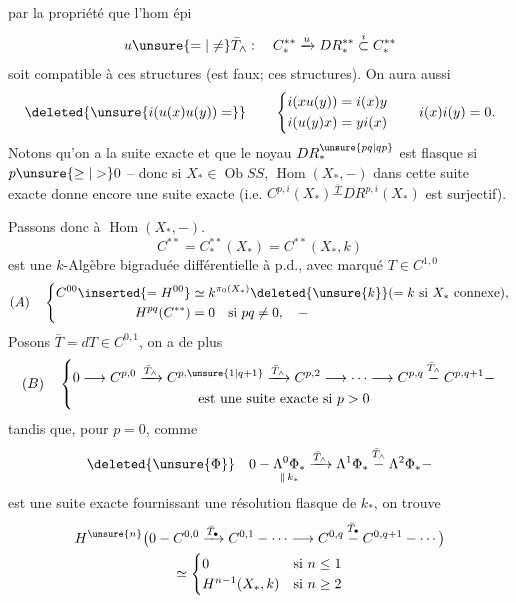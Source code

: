 par la propriété que l'hom épi
\[
u\unsure{=|\ne}\bar T_\wedge:\quad C_*^{**}\xrightarrow{u}DR_*^{**}\overset{i}{\subset}C_*^{**}
\]
soit compatible à ces structures (est faux;  \uline{} ces structures).
On aura aussi
\[
\deleted{\unsure{i(u(x)u(y))=}}\qquad
\left\{\begin{aligned}
i(xu(y))&=i(x)y\\
i(u(y)x)&=yi(x)
\end{aligned}\right.
\qquad i(x)i(y)=0 .
\]
Notons qu'on a la suite exacte
et que le noyau $DR_*^{\unsure{pq|qp}}$ est flasque si $p\unsure{\geq|>}0$ --
donc si $X_*\in\operatorname{Ob}SS$, $\operatorname{Hom}(X_*,-)$ dans cette suite exacte donne encore une suite exacte
(i.e.  $C^{p,i}(X_*)\overset{\bar T}{-}DR^{p,i}(X_*)$ est surjectif).

Passons donc à $\operatorname{Hom}(X_*,-)$.
\[
C^{**}=C_*^{**}(X_*)=C^{**}(X_*,k)
\]
est une $k$-Algèbre bigraduée différentielle à p.d., avec  marqué $T\in C^{1,0}$
\[
(A)\quad
\left\{\begin{aligned}
C^{00}\inserted{=H^{00}}&\simeq k^{\pi_0(X_*)}\deleted{\unsure{k}}(=k\text{ si }X_*\text{ connexe}),\\
H^{pq}(C^{**})&=0\quad\text{si }pq\ne0,\quad -
\end{aligned}\right.
\]
Posons $\bar T=dT\in C^{0,1}$, on a de plus
\[
(B)\quad\left\{\begin{gathered}
0\longrightarrow C^{p,0}\xrightarrow{\bar T_\wedge}C^{p,\unsure{1|q+1}}
\xrightarrow{\bar T_\wedge}C^{p,2}\longrightarrow\cdots
\longrightarrow C^{p,q}\overset{\bar T_\wedge}{-}C^{p,q+1}-\\
\text{est une suite exacte si }p>0
\end{gathered}\right.
\]
tandis que, pour $p=0$, comme
\[
\deleted{\unsure{\Phi}}\quad
0-\underset{\Vert\,k_*}{\Lambda^0\Phi_*}
\xrightarrow{\bar T_\wedge}\Lambda^1\Phi_*
\overset{\bar T_\wedge}{-}\Lambda^2\Phi_*-
\]
est une suite exacte fournissant une résolution flasque de $k_*$, on trouve
\[
\begin{gathered}
H^{\unsure{n}}\bigl(0-C^{0,0}\xrightarrow{\bar T_\bullet}C^{0,1}
-\cdots\longrightarrow C^{0,q}\overset{\bar T_\bullet}{-}C^{0,q+1}-\cdots\bigr)\\
\simeq\begin{cases}
0&\text{si }n\leq1\\
H^{n-1}(X_*,k)&\text{si }n\geq2
\end{cases}
\end{gathered}
\]
